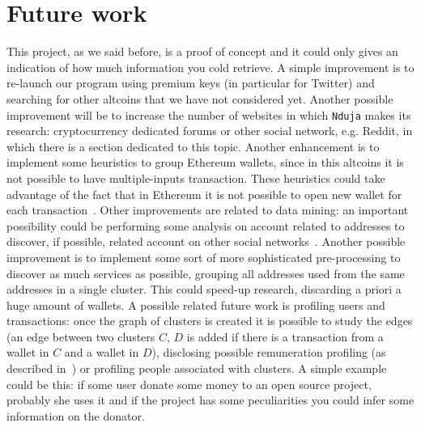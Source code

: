 \section{Future work} \label{future}
This project, as we said before, is a proof of concept and it could only gives
an indication of how much information you cold retrieve. A simple improvement
is to re-launch our program using premium keys (in particular for Twitter) and
searching for other altcoins that we have not considered yet. Another possible
improvement will be to increase the number of websites in which \texttt{Nduja}
makes its research: cryptocurrency dedicated forums or other social network,
e.g. Reddit, in which there is a section dedicated to this topic. Another
enhancement is to implement some heuristics to group Ethereum wallets, since in
this altcoins it is not possible to have multiple-inputs transaction. These
heuristics could take advantage of the fact that in Ethereum it is
not possible to open new wallet for each transaction~\cite{bib:ethersok}. Other
improvements are related to data mining: an important possibility could be
performing some analysis on account related to addresses to discover, if
possible, related account on other social networks~\cite{bib:osinference}.
Another possible improvement is to implement some sort of more sophisticated
pre-processing to discover as much services as possible, grouping all addresses
used from the same addresses in a single cluster. This could speed-up research,
discarding a priori a huge amount of wallets. A possible related future work is
profiling users and transactions: once the graph of clusters is created it is possible to study the edges (an edge between two clusters $C$, $D$ is added
if there is a transaction from a wallet in $C$ and a wallet in $D$), disclosing possible remuneration profiling (as described
in~\cite{bib:fullDiscl}) or profiling people associated with clusters. A simple
example could be this: if some user donate some money to an open source project,
probably she uses it and if the project has some peculiarities you could infer
some information on the donator.
